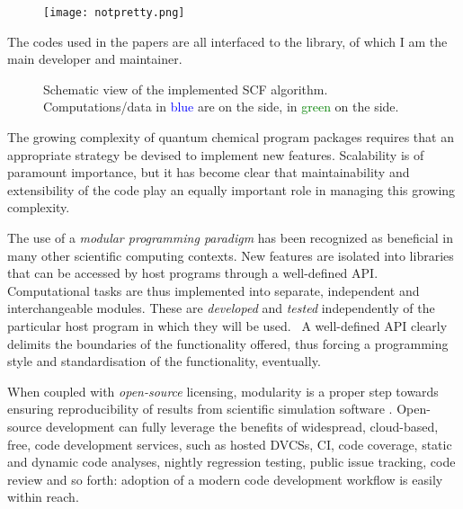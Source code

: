 \begin{figure}[!htb]
\centering
\texttt{[image: notpretty.png]}
\end{figure}

The codes used in the papers are all interfaced to the \pcmsolver library,
of which I am the main developer and maintainer.

\begin{figure}[!htb]
\centering
\scalebox{0.8}{}
\caption[Modular approach to programming a \acs{PCM} functionality into an existing \acs{SCF} code.]{
  Schematic view of the implemented SCF algorithm. Computations/data in
  \textcolor{Blue}{blue} are on the \pcmsolver side, in
  \textcolor{Green}{green} on the \DIRAC side.
  }
\label{fig:algorithm}
\end{figure}

The growing complexity of quantum chemical program packages requires that an
appropriate strategy be devised to implement new features.
Scalability is of paramount importance, but it has become clear that
maintainability and extensibility of the code play an equally important role in
managing this growing complexity.~\autocite{Hatton1994-us, Hatton1997-ml,
Hatton1997-bb, Ioannidis2005-aj, Merali2010-uy, Prinz2011-kz, Wilson2014-vh}

The use of a \emph{modular programming paradigm} has been recognized as
beneficial in many other scientific computing contexts. New features are
isolated into libraries that can be accessed by host programs through a
well-defined \ac{API}.
Computational tasks are thus implemented into separate, independent and
interchangeable modules. These are \emph{developed} and \emph{tested}
independently of the particular host program in which they will be
used.~\cite{Dijkstra1968-zp, Parnas1972-im}
A well-defined \ac{API} clearly delimits the boundaries of the functionality
offered, thus forcing a programming style and standardisation of the
functionality, eventually.~\autocite{Reddy2011-sd}

When coupled with \emph{open-source} licensing, modularity is a proper
step towards ensuring reproducibility of results from scientific
simulation software \cite{Gezelter2015-gz, Krylov2015-fs, Jacob2016-oq}.
Open-source development can fully leverage the benefits
of widespread, cloud-based, free, code development services, such as
hosted \acp{DVCS}, \ac{CI}, code
coverage, static and dynamic code analyses, nightly regression testing,
public issue tracking, code review and so forth:
adoption of a modern code development workflow is easily within reach.


